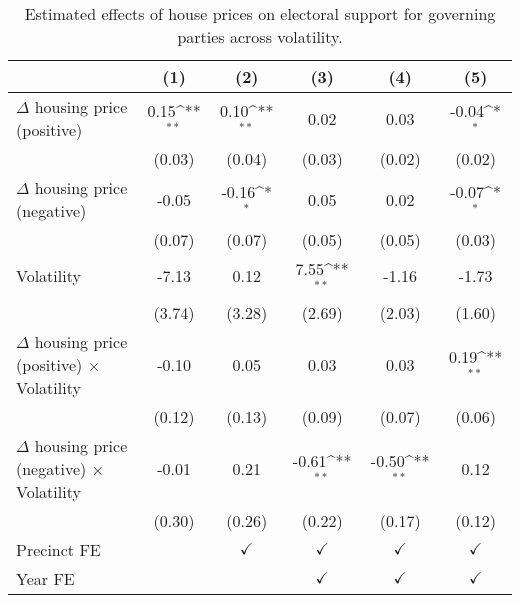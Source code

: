 \begin{table}[htbp]\centering
\def\sym#1{\ifmmode^{#1}\else\(^{#1}\)\fi}
\caption{Estimated effects of house prices on electoral support for governing parties across volatility.} \label{tab6}
\begin{tabular}{l*{5}{c}}
\hline\hline
                    &\multicolumn{1}{c}{(1)}        &\multicolumn{1}{c}{(2)}        &\multicolumn{1}{c}{(3)}        &\multicolumn{1}{c}{(4)}        &\multicolumn{1}{c}{(5)}        \\
\hline
$\Delta$ housing price (positive)&        0.15\sym{**}&        0.10\sym{**}&        0.02        &        0.03        &       -0.04\sym{*} \\
                    &      (0.03)        &      (0.04)        &      (0.03)        &      (0.02)        &      (0.02)        \\
[1em]
$\Delta$ housing price (negative)&       -0.05        &       -0.16\sym{*} &        0.05        &        0.02        &       -0.07\sym{*} \\
                    &      (0.07)        &      (0.07)        &      (0.05)        &      (0.05)        &      (0.03)        \\
[1em]
Volatility          &       -7.13        &        0.12        &        7.55\sym{**}&       -1.16        &       -1.73        \\
                    &      (3.74)        &      (3.28)        &      (2.69)        &      (2.03)        &      (1.60)        \\
[1em]
$\Delta$ housing price (positive) $\times$ Volatility&       -0.10        &        0.05        &        0.03        &        0.03        &        0.19\sym{**}\\
                    &      (0.12)        &      (0.13)        &      (0.09)        &      (0.07)        &      (0.06)        \\
[1em]
$\Delta$ housing price (negative) $\times$ Volatility&       -0.01        &        0.21        &       -0.61\sym{**}&       -0.50\sym{**}&        0.12        \\
                    &      (0.30)        &      (0.26)        &      (0.22)        &      (0.17)        &      (0.12)        \\
[1em]
\hline Precinct FE  &                    &$\checkmark$        &$\checkmark$        &$\checkmark$        &$\checkmark$        \\
[1em]
Year FE             &                    &                    &$\checkmark$        &$\checkmark$        &$\checkmark$        \\

\end{tabular}
\end{table}

